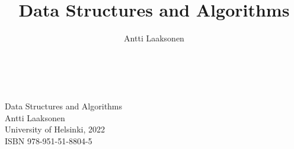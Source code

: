 \documentclass[twoside,12pt,a4paper,english]{book}
\begin{document}
\author{Antti Laaksonen}
\title{Data Structures and Algorithms}
\date{}
\maketitle
\thispagestyle{empty}
~\\
\vspace{16cm}
~\\
Data Structures and Algorithms \\
Antti Laaksonen \\
University of Helsinki, 2022 \\
ISBN 978-951-51-8804-5 \\
\frontmatter

\tableofcontents
\mainmatter















\appendix

%
\backmatter
\printindex
\end{document}
